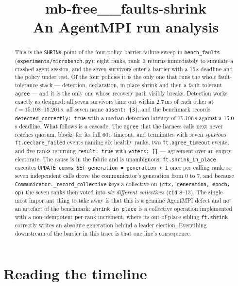 \documentclass[11pt]{article}
\title{\textbf{mb-free\_\_faults-shrink}\\[2pt]\large An AgentMPI run analysis}
\author{}
\date{}
\begin{document}
\maketitle

\begin{abstract}
This is the \texttt{SHRINK} point of the four-policy barrier-failure sweep in
\texttt{bench\_faults} (\texttt{experiments/microbench.py}): eight ranks, rank~3 returns
immediately to simulate a crashed agent session, and the seven survivors enter a barrier
with a 15\,s deadline and the policy under test. Of the four policies it is the only one
that runs the whole fault-tolerance stack --- detection, declaration, in-place shrink and
then a fault-tolerant \texttt{agree} --- and it is the only one whose recovery path
visibly breaks. Detection works exactly as designed: all seven survivors time out within
2.7\,ms of each other at $t=15.198$--15.201\,s, all seven name \texttt{absent:\ [3]},
and the benchmark records \texttt{detected\_correctly:\ true} with a median detection
latency of 15.196\,s against a 15.0\,s deadline. What follows is a cascade. The
\texttt{agree} that the harness calls next never reaches quorum, blocks for its full 60\,s
timeout, and terminates with seven \emph{spurious} \texttt{ft.declare\_failed} events
naming six healthy ranks, two \texttt{ft.agree\_timeout} events, and five ranks returning
\texttt{result:\ true} with \texttt{voters:\ []} --- agreement over an empty electorate.
The cause is in the fabric and is unambiguous: \texttt{ft.shrink\_in\_place} executes
\texttt{UPDATE comms SET generation = generation + 1} once per calling rank, so seven
independent calls drove the communicator's generation from 0 to 7, and because
\texttt{Communicator.\_record\_collective} keys a collective on
\texttt{(ctx, generation, epoch, op)} the seven ranks then voted into \emph{six different
collectives} (\texttt{cid} 8--13). The single most important thing to take away is that
this is a genuine AgentMPI defect and not an artefact of the benchmark:
\texttt{shrink\_in\_place} is a collective operation implemented with a non-idempotent
per-rank increment, where its out-of-place sibling \texttt{ft.shrink} correctly writes an
absolute generation behind a leader election. Everything downstream of the barrier in
this trace is that one line's consequence.
\end{abstract}



\section{Reading the timeline}
\end{document}
